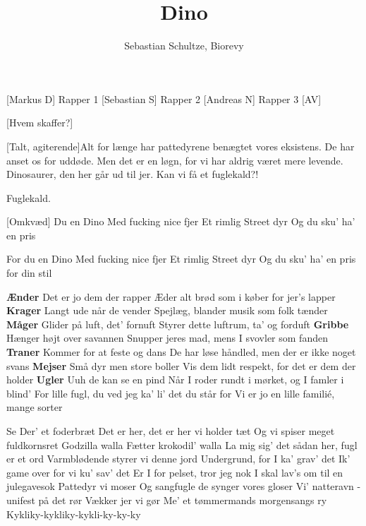 \documentclass[a4paper,12pt]{article}
\title{Dino}
\author{Sebastian Schultze, Biorevy}
\begin{document}
\maketitle

\begin{texxers}
\end{texxers}

\begin{roles}
	[Markus D] Rapper 1
	[Sebastian S] Rapper 2
	[Andreas N] Rapper 3
	[AV]
\end{roles}


\begin{props}
	[Hvem skaffer?] 
\end{props}

\begin{song}

[Talt, agiterende]Alt for længe har pattedyrene benægtet vores eksistens. De har anset os for uddøde. Men det er en løgn, for vi har aldrig været mere levende. Dinosaurer, den her går ud til jer. Kan vi få et fuglekald?!


 Fuglekald.

[Omkvæd]
Du en Dino
Med fucking nice fjer
Et rimlig Street dyr
Og du sku' ha' en pris

For du en Dino
Med fucking nice fjer
Et rimlig Street dyr
Og du sku' ha' en pris for din stil

\textbf{Ænder}
Det er jo dem der rapper
Æder alt brød som i køber for jer's lapper
\textbf{Krager}
Langt ude når de vender
Spejlæg, blander musik som folk tænder
\textbf{Måger}
Glider på luft, det' fornuft
Styrer dette luftrum, ta' og forduft
\textbf{Gribbe}
Hænger højt over savannen
Snupper jeres mad, mens I svovler som fanden
\textbf{Traner}
Kommer for at feste og dans
De har løse håndled, men der er ikke noget svans
\textbf{Mejser}
Små dyr men store boller
Vis dem lidt respekt, for det er dem der holder
\textbf{Ugler}
Uuh de kan se en pind
Når I roder rundt i mørket, og I famler i blind'
For lille fugl, du ved jeg ka' li' det du står for
Vi er jo en lille familié, mange sorter

Se
Der' et foderbræt
Det er her, det er her vi holder tæt
Og vi spiser meget fuldkornsret
Godzilla walla
Fætter krokodil' walla
La mig sig' det sådan her, fugl er et ord
Varmblødende styrer vi denne jord
Undergrund, for I ka' grav' det
Ik' game over for vi ku' sav' det
Er I for pelset, tror jeg nok
I skal lav's om til en julegavesok
Pattedyr vi moser
Og sangfugle de synger vores gloser
Vi' natteravn - unifest på det rør
Vækker jer vi gør
Me' et tømmermands morgensangs ry
Kykliky-kykliky-kykli-ky-ky-ky


\end{song}
\end{document}
